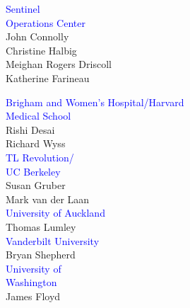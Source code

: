\documentclass[10pt, table]{beamer}
\begin{document}
\begin{frame}
\begin{minipage}{0.33\textwidth}
    \textcolor{blue}{Sentinel \\ Operations Center} \\
    John Connolly \\
    Christine Halbig \\
    Meighan Rogers Driscoll \\
    Katherine Farineau
\end{minipage}
\begin{minipage}{0.33\textwidth}
  \vspace{-0.5cm}\textcolor{blue}{Brigham and Women's Hospital/Harvard \\Medical School}\\
  Rishi Desai \\
  Richard Wyss \\
  \textcolor{blue}{TL Revolution/\\UC Berkeley} \\
  Susan Gruber \\
  Mark van der Laan \\
  \textcolor{blue}{University of Auckland} \\
  Thomas Lumley\\
  \textcolor{blue}{Vanderbilt University}\\
  Bryan Shepherd\\
\textcolor{blue}{University of \\ Washington}\\
  James Floyd
\end{minipage}
\end{frame}
  
\end{document}

